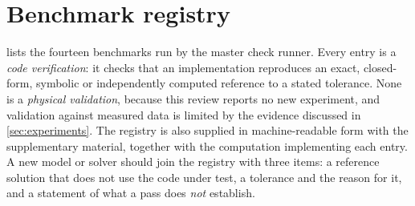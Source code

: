\section{Benchmark registry}\label{app:registry}
 lists the fourteen benchmarks run by the master check runner. Every entry is a \emph{code verification}: it checks that an implementation reproduces an exact, closed-form, symbolic or independently computed reference to a stated tolerance. None is a \emph{physical validation}, because this review reports no new experiment, and validation against measured data is limited by the evidence discussed in \cref{sec:experiments}. The registry is also supplied in machine-readable form with the supplementary material, together with the computation implementing each entry. A new model or solver should join the registry with three items: a reference solution that does not use the code under test, a tolerance and the reason for it, and a statement of what a pass does \emph{not} establish.

